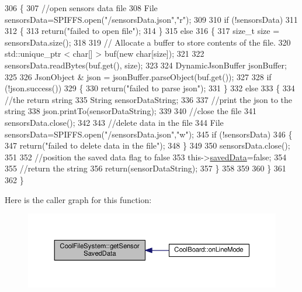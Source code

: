 \begin{DoxyCode}
306 \{
307     \textcolor{comment}{//open sensors data file}
308     File sensorsData=SPIFFS.open(\textcolor{stringliteral}{"/sensorsData.json"},\textcolor{stringliteral}{"r"});
309     
310     \textcolor{keywordflow}{if} (!sensorsData)
311 
312     \{
313         \textcolor{keywordflow}{return}(\textcolor{stringliteral}{"failed to open file"});
314     \}
315     \textcolor{keywordflow}{else}
316     \{
317         \textcolor{keywordtype}{size\_t} size = sensorsData.size();
318 
319         \textcolor{comment}{// Allocate a buffer to store contents of the file.}
320         std::unique\_ptr < char[] > buf(\textcolor{keyword}{new} \textcolor{keywordtype}{char}[size]);
321 
322         sensorsData.readBytes(buf.get(), size);
323 
324         DynamicJsonBuffer jsonBuffer;
325 
326         JsonObject & json = jsonBuffer.parseObject(buf.get());
327         
328         \textcolor{keywordflow}{if} (!json.success())
329         \{
330             \textcolor{keywordflow}{return}(\textcolor{stringliteral}{"failed to parse json"});
331         \}
332         \textcolor{keywordflow}{else}
333         \{   
334             \textcolor{comment}{//the return string}
335             String sensorDataString;
336             
337             \textcolor{comment}{//print the json to the string}
338             json.printTo(sensorDataString);
339             
340             \textcolor{comment}{//close the file}
341             sensorsData.close();
342 
343             \textcolor{comment}{//delete data in the file}
344             File sensorsData=SPIFFS.open(\textcolor{stringliteral}{"/sensorsData.json"},\textcolor{stringliteral}{"w"});
345             \textcolor{keywordflow}{if} (!sensorsData)   
346             \{
347                 \textcolor{keywordflow}{return}(\textcolor{stringliteral}{"failed to delete data in the file"});
348             \}
349 
350             sensorsData.close();
351             
352             \textcolor{comment}{//position the saved data flag to false}
353             this->\hyperlink{classCoolFileSystem_ad398e0c5c41a0c88acdf5d672aa71351}{savedData}=\textcolor{keyword}{false};         
354 
355             \textcolor{comment}{//return the string}
356             \textcolor{keywordflow}{return}(sensorDataString);       
357         \}
358         
359         
360     \}
361 
362 \}
\end{DoxyCode}
Here is the caller graph for this function\+:
\nopagebreak
\begin{figure}[H]
\begin{center}
\leavevmode
\includegraphics[width=350pt]{classCoolFileSystem_a5c58bca3735c0ed3efb268d70ef998ef_icgraph}
\end{center}
\end{figure}
